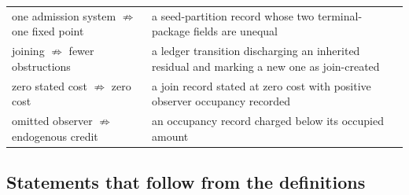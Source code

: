{\begin{longtable}{@{}>{\raggedright\arraybackslash}p{5.6cm}>{\raggedright\arraybackslash}p{9.3cm}@{}}
one admission system $\not\Rightarrow$ one fixed point & a seed-partition record whose two terminal-package fields are unequal \\
joining $\not\Rightarrow$ fewer obstructions & a ledger transition discharging an inherited residual and marking a new one as join-created \\
zero stated cost $\not\Rightarrow$ zero cost & a join record stated at zero cost with positive observer occupancy recorded \\
omitted observer $\not\Rightarrow$ endogenous credit & an occupancy record charged below its occupied amount \\
\end{longtable}
}


\subsection{Statements that follow from the definitions}
\label{supp:definitional}

